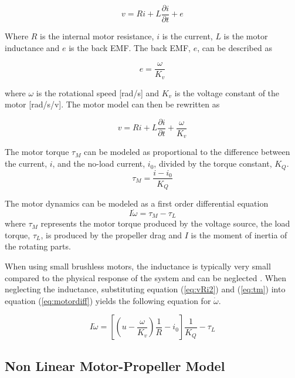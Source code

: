 \begin{equation}
    \label{eq:vRi}
    v = Ri + L\frac{\partial i}{\partial t} + e
\end{equation} 

Where $R$ is the internal motor resistance, $i$ is the current, $L$ is the motor inductance and $e$ is the back EMF. The back EMF, $e$, can be described as

\begin{equation}
    e = \frac{\omega}{K_v}
\end{equation}

where $\omega$ is the rotational speed [rad/s] and $K_v$ is the voltage constant of the motor [rad/s/v]. The motor model can then be rewritten as

\begin{equation}
\label{eq:vRi2}
    v = Ri + L\frac{\partial i}{\partial t} + \frac{\omega}{K_v}
\end{equation}
\bigskip

The motor torque $\tau_M$ can be modeled as proportional to the difference between the current, $i$, and the no-load current, $i_0$, divided by the torque constant, $K_Q$.  
\begin{equation}
    \label{eq:tm}
    \tau_M = \frac{i - i_0}{K_Q}
\end{equation}
\bigskip

The motor dynamics can be modeled as a first order differential equation
\begin{equation}
    \label{eq:motordiff}
    I\dot{\omega} = \tau_M - \tau_L
\end{equation}
where $\tau_M$ represents the motor torque produced by the voltage source, the load torque, $\tau_L$, is produced by the propeller drag and $I$ is the moment of inertia of the rotating parts. \bigskip

When using small brushless motors, the inductance is typically very small compared to the physical response of the system and can be neglected \cite{MITvpp}. When neglecting the inductance, substituting equation (\ref{eq:vRi2}) and (\ref{eq:tm}) into equation (\ref{eq:motordiff}) yields the following equation for $\dot\omega$.

\begin{equation}
    \label{eq:iomega}
    I\dot{\omega} =\left[\left(u-\frac{\omega}{K_v}\right)\frac{1}{R}-i_0\right]\frac{1}{K_Q} - \tau_L
\end{equation}
\newpage

\subsection{Non Linear Motor-Propeller Model}


